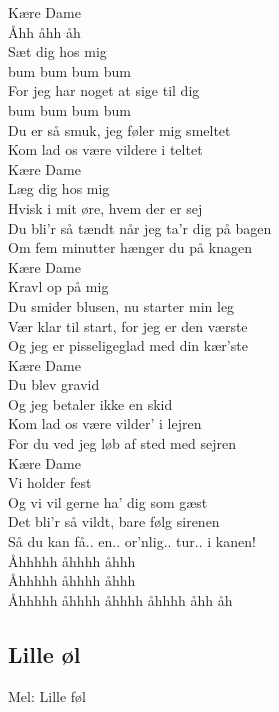 Kære Dame\\
Åhh åhh åh\\
Sæt dig hos mig\\
bum bum bum bum\\
For jeg har noget at sige til dig\\
bum bum bum bum\\
Du er så smuk, jeg føler mig smeltet\\
Kom lad os være vildere i teltet\\

Kære Dame\\
Læg dig hos mig\\
Hvisk i mit øre, hvem der er sej\\
Du bli’r så tændt når jeg ta’r dig på bagen\\
Om fem minutter hænger du på knagen\\

Kære Dame\\
Kravl op på mig\\
Du smider blusen, nu starter min leg\\
Vær klar til start, for jeg er den værste\\
Og jeg er pisseligeglad med din kær’ste\\

Kære Dame\\
Du blev gravid\\
Og jeg betaler ikke en skid\\
Kom lad os være vilder’ i lejren\\
For du ved jeg løb af sted med sejren\\

Kære Dame\\
Vi holder fest\\
Og vi vil gerne ha’ dig som gæst\\
Det bli’r så vildt, bare følg sirenen\\
Så du kan få.. en.. or’nlig.. tur.. i kanen!\\

Åhhhhh åhhhh åhhh\\
Åhhhhh åhhhh åhhh\\
Åhhhhh åhhhh åhhhh åhhhh åhh åh\\

\subsection*{Lille øl}

Mel: Lille føl\\

